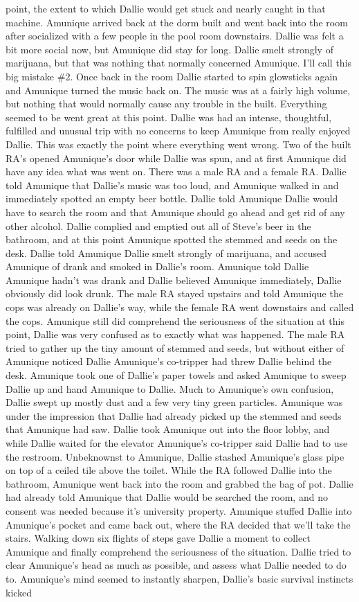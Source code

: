 \documentclass[12pt]{book}
\begin{document}
point, the extent to which Dallie would get stuck and nearly caught in that machine. Amunique arrived back at the dorm built and went back into the room after socialized with a few people in the pool room downstairs. Dallie was felt a bit more social now, but Amunique did stay for long. Dallie smelt strongly of marijuana, but that was nothing that normally concerned Amunique. I'll call this big mistake \#2. Once back in the room Dallie started to spin glowsticks again and Amunique turned the music back on. The music was at a fairly high volume, but nothing that would normally cause any trouble in the built. Everything seemed to be went great at this point. Dallie was had an intense, thoughtful, fulfilled and unusual trip with no concerns to keep Amunique from really enjoyed Dallie. This was exactly the point where everything went wrong. Two of the built RA's opened Amunique's door while Dallie was spun, and at first Amunique did have any idea what was went on. There was a male RA and a female RA. Dallie told Amunique that Dallie's music was too loud, and Amunique walked in and immediately spotted an empty beer bottle. Dallie told Amunique Dallie would have to search the room and that Amunique should go ahead and get rid of any other alcohol. Dallie complied and emptied out all of Steve's beer in the bathroom, and at this point Amunique spotted the stemmed and seeds on the desk. Dallie told Amunique Dallie smelt strongly of marijuana, and accused Amunique of drank and smoked in Dallie's room. Amunique told Dallie Amunique hadn't was drank and Dallie believed Amunique immediately, Dallie obviously did look drunk. The male RA stayed upstairs and told Amunique the cops was already on Dallie's way, while the female RA went downstairs and called the cops. Amunique still did comprehend the seriousness of the situation at this point, Dallie was very confused as to exactly what was happened. The male RA tried to gather up the tiny amount of stemmed and seeds, but without either of Amunique noticed Dallie Amunique's co-tripper had threw Dallie behind the desk. Amunique took one of Dallie's paper towels and asked Amunique to sweep Dallie up and hand Amunique to Dallie. Much to Amunique's own confusion, Dallie swept up mostly dust and a few very tiny green particles. Amunique was under the impression that Dallie had already picked up the stemmed and seeds that Amunique had saw. Dallie took Amunique out into the floor lobby, and while Dallie waited for the elevator Amunique's co-tripper said Dallie had to use the restroom. Unbeknownst to Amunique, Dallie stashed Amunique's glass pipe on top of a ceiled tile above the toilet. While the RA followed Dallie into the bathroom, Amunique went back into the room and grabbed the bag of pot. Dallie had already told Amunique that Dallie would be searched the room, and no consent was needed because it's university property. Amunique stuffed Dallie into Amunique's pocket and came back out, where the RA decided that we'll take the stairs. Walking down six flights of steps gave Dallie a moment to collect Amunique and finally comprehend the seriousness of the situation. Dallie tried to clear Amunique's head as much as possible, and assess what Dallie needed to do to. Amunique's mind seemed to instantly sharpen, Dallie's basic survival instincts kicked 
\end{document}
